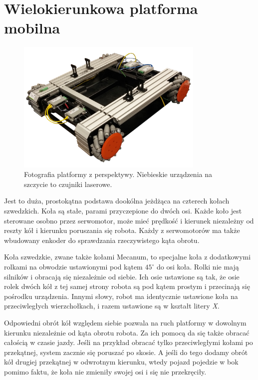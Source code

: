 \section{Wielokierunkowa platforma mobilna}
\begin{figure}
\centering
 \includegraphics[width=0.8\textwidth]{graphics/base_photo.png}
\caption{Fotografia platformy z perspektywy. Niebieskie urządzenia na szczycie to czujniki laserowe.}
\end{figure} 
Jest to duża, prostokątna podstawa dookólna jeżdżąca na czterech kołach szwedzkich.
Koła są stałe, parami przyczepione do dwóch osi.
Każde koło jest sterowane osobno przez serwomotor, może mieć prędkość i kierunek niezależny od reszty kół i kierunku poruszania się robota.
Każdy z serwomotorów ma także wbudowany enkoder do sprawdzania rzeczywistego kąta obrotu.

Koła szwedzkie, zwane także kołami Mecanum, to specjalne koła z dodatkowymi rolkami na obwodzie ustawionymi pod kątem $45^\circ$ do osi koła.
Rolki nie mają silników i obracają się niezależnie od siebie.
Ich osie ustawione są tak, że osie rolek dwóch kół z tej samej strony robota są pod kątem prostym i przecinają się pośrodku urządzenia.
Innymi słowy, robot ma identycznie ustawione koła na przeciwległych wierzchołkach, i razem ustawione są w kształt litery \emph{X}.

Odpowiedni obrót kół względem siebie pozwala na ruch platformy w dowolnym kierunku niezależnie od kąta obrotu robota.
Za ich pomocą da się także obracać całością w czasie jazdy.
Jeśli na przykład obracać tylko przeciwległymi kołami po przekątnej, system zacznie się poruszać po skosie.
A jeśli do tego dodamy obrót kół drugiej przekątnej w odwrotnym kierunku, wtedy pojazd pojedzie w bok pomimo faktu, że koła nie zmieniły swojej osi i się nie przekręciły.

